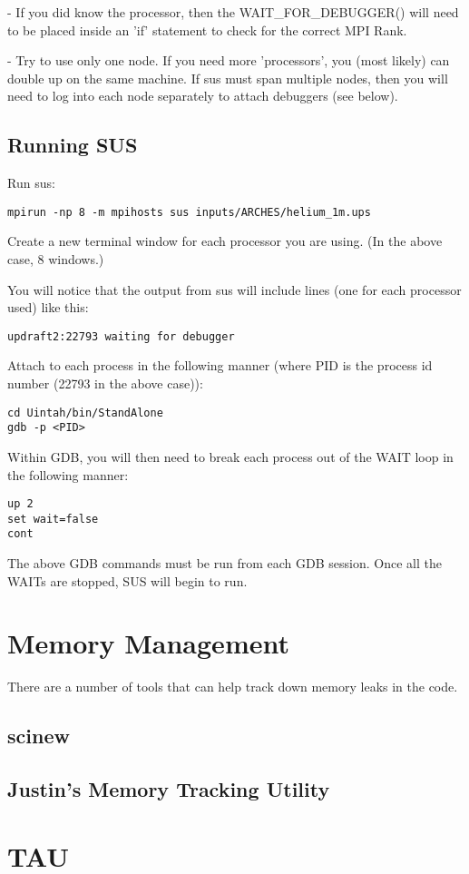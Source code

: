 - If you did know the processor, then the WAIT_FOR_DEBUGGER() will
need to be placed inside an 'if' statement to check for the correct
MPI Rank.

- Try to use only one node.  If you need more 'processors', you (most
likely) can double up on the same machine.  If sus must span multiple
nodes, then you will need to log into each node separately to attach
debuggers (see below).

\subsection{Running SUS}

Run sus:

\begin{Verbatim}
mpirun -np 8 -m mpihosts sus inputs/ARCHES/helium_1m.ups
\end{Verbatim}

Create a new terminal window for each processor you are using.  (In
the above case, 8 windows.)  

You will notice that the output from sus will include lines (one for
each processor used) like this:

\begin{Verbatim}
updraft2:22793 waiting for debugger
\end{Verbatim}

Attach to each process in the following manner (where PID is the
process id number (22793 in the above case)):

\begin{Verbatim}
cd Uintah/bin/StandAlone
gdb -p <PID>
\end{Verbatim}

Within GDB, you will then need to break each process out of the WAIT loop in the
following manner:

\begin{Verbatim}
up 2
set wait=false
cont
\end{Verbatim}

The above GDB commands must be run from each GDB session.  Once all
the WAITs are stopped, SUS will begin to run.

\section{Memory Management}

There are a number of tools that can help track down memory leaks in
the code.

\subsection{scinew}

\subsection{Justin's Memory Tracking Utility}

\section{TAU}

